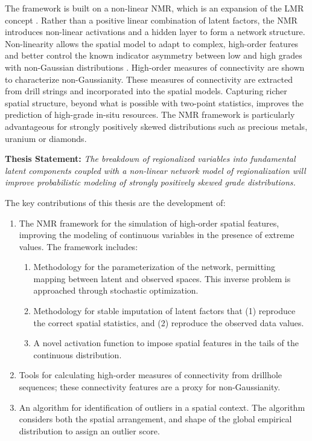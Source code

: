 The framework is built on a non-linear \acrfull{NMR}, which is an expansion of the \acrfull{LMR} concept \citep{journel1974geostatistics}. Rather than a positive linear combination of latent factors, the \gls{NMR} introduces non-linear activations and a hidden layer to form a network structure. Non-linearity allows the spatial model to adapt to complex, high-order features and better control the known indicator asymmetry between low and high grades with non-Gaussian distributions \citep{journel1989nongaussian}. High-order measures of connectivity are shown to characterize non-Gaussianity. These measures of connectivity are extracted from drill strings and incorporated into the spatial models. Capturing richer spatial structure, beyond what is possible with two-point statistics, improves the prediction of high-grade in-situ resources. The \gls{NMR} framework is particularly advantageous for strongly positively skewed distributions such as precious metals, uranium or diamonds.

\vspace{\baselineskip}
\begin{tcolorbox}[]
    \textbf{Thesis Statement:} \textit{The breakdown of regionalized variables into fundamental latent components coupled with a non-linear network model of regionalization will improve probabilistic modeling of strongly positively skewed grade distributions.}
\end{tcolorbox}
\vspace{\baselineskip}

The key contributions of this thesis are the development of:
\begin{enumerate}[noitemsep]
    \item The \gls{NMR} framework for the simulation of high-order spatial features, improving the modeling of continuous variables in the presence of extreme values. The framework includes:
          \begin{enumerate}[noitemsep]
              \item Methodology for the parameterization of the network, permitting mapping between latent and observed spaces. This inverse problem is approached through stochastic optimization.
              \item Methodology for stable imputation of latent factors that (1) reproduce the correct spatial statistics, and (2) reproduce the observed data values.
              \item A novel activation function to impose spatial features in the tails of the continuous distribution.
          \end{enumerate}
    \item Tools for calculating high-order measures of connectivity from drillhole sequences; these connectivity features are a proxy for non-Gaussianity.
    \item An algorithm for identification of outliers in a spatial context. The algorithm considers both the spatial arrangement, and shape of the global empirical distribution to assign an outlier score.
\end{enumerate}

